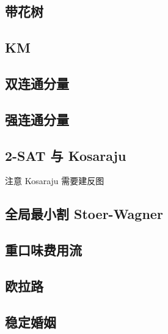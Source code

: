 \documentclass[landscape, twocolumn, 8pt, a4paper, twoside]{extarticle}
\begin{document}
\begin{spacing}{0.1}
\subsection{带花树}


\subsection{KM}


\subsection{双连通分量}


\subsection{强连通分量}


\subsection{2-SAT 与 Kosaraju}
注意 Kosaraju 需要建反图


\subsection{全局最小割 Stoer-Wagner}


%

\subsection{重口味费用流}


\subsection{欧拉路}


\subsection{稳定婚姻}



\end{spacing}
\end{document}
